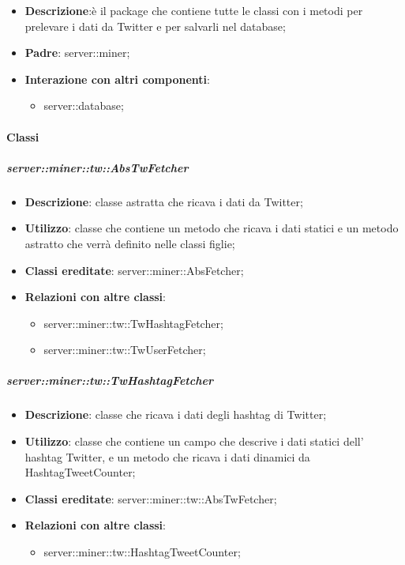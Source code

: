 \begin{itemize}
  \item \textbf{Descrizione}:è il package che contiene tutte le classi con i metodi per prelevare
i dati da Twitter e per salvarli nel database;
  \item \textbf{Padre}: server::miner;
  \item \textbf{Interazione con altri componenti}:
  	\begin{itemize}
  		\item server::database; 	
  	\end{itemize}
\end{itemize}	

	\paragraph{Classi} %
	\subparagraph{server::miner::tw::AbsTwFetcher} %
		\label{subp:server_miner_tw_AbsTwFetcher}
			\begin{itemize}
				\item \textbf{Descrizione}: classe astratta che ricava i dati da Twitter;
				\item \textbf{Utilizzo}: classe che contiene un metodo che ricava i dati statici e un metodo
astratto che verrà definito nelle classi figlie;
				\item \textbf{Classi ereditate}: server::miner::AbsFetcher;
				\item \textbf{Relazioni con altre classi}:
					\begin{itemize}
						\item server::miner::tw::TwHashtagFetcher;
						\item server::miner::tw::TwUserFetcher;
					\end{itemize}
			\end{itemize}
		
	\subparagraph{server::miner::tw::TwHashtagFetcher} %
		\label{subp:server_miner_tw_TwHashtagFetcher}
			\begin{itemize}
				\item \textbf{Descrizione}: classe che ricava i dati degli hashtag di Twitter;
				\item \textbf{Utilizzo}: classe che contiene un campo che descrive i dati statici dell' hashtag Twitter, e un metodo che ricava i dati dinamici da HashtagTweetCounter;
				\item \textbf{Classi ereditate}: server::miner::tw::AbsTwFetcher;
				\item \textbf{Relazioni con altre classi}: 
					\begin{itemize}
						\item server::miner::tw::HashtagTweetCounter;
					\end{itemize}
			\end{itemize}
		
